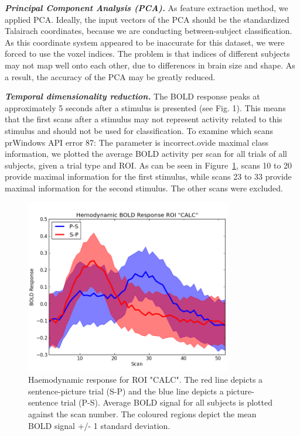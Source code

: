 \documentclass[preprint,journal,11pt]{vgtc}
\begin{document}
\textbf{\emph{Principal Component Analysis (PCA).}} As feature extraction method, we applied PCA. Ideally, the input vectors of the PCA should be the standardized Talairach coordinates, because we are conducting between-subject classification. As this coordinate system appeared to be inaccurate for this dataset, we were forced to use the voxel indices. The problem is that indices of different subjects may not map well onto each other, due to differences in brain size and shape. As a result, the accuracy of the PCA may be greatly reduced.   

\textbf{\emph{Temporal dimensionality reduction.}} The BOLD response peaks at approximately 5 seconds after a stimulus is presented (see Fig. 1). This means that the first scans after a stimulus may not represent activity related to this stimulus and should not be used for classification. To examine which scans prWindows API error 87: The parameter is incorrect.ovide maximal class information, we plotted the average BOLD activity per scan for all trials of all subjects, given a trial type and ROI. As can be seen in Figure~\ref{fig:boldroi}, scans 10 to 20 provide maximal information for the first stimulus, while scans 23 to 33 provide maximal information for the second stimulus. The other scans were excluded.      
\begin{figure}
	\centering
	\includegraphics[width=90mm]{figures/scan_hemodynamic_BOLD_roi}
  	\caption{Haemodynamic response for ROI "CALC". The red line depicts a sentence-picture trial (S-P) and the blue line depicts a picture-sentence trial (P-S). Average BOLD signal for all subjects is plotted against the scan number. The coloured regions depict the mean BOLD signal +/- 1 standard deviation.}
  	\label{fig:boldroi}
\end{figure}
\end{document}
